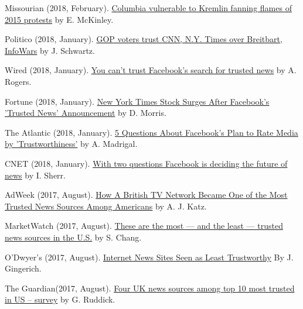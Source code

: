 \begin{bibenum}
    \item[] Missourian (2018, February).
      \href{https://www.columbiamissourian.com/news/higher_education/columbia-vulnerable-to-kremlin-fanning-flames-of-protests/article_929cf366-11ad-11e8-9631-63ac0b4a6fd3.html}{Columbia vulnerable to Kremlin fanning flames of 2015 protests} by E. McKinley.
    \item[] Politico (2018, January).
      \href{https://www.politico.com/amp/story/2018/02/06/gop-republican-voters-media-bias-trusted-sites-393650}{ GOP voters trust CNN, N.Y. Times over Breitbart, InfoWars} by J. Schwartz.
    \item[] Wired (2018, January).
      \href{https://www.wired.com/story/you-cant-trust-facebooks-search-for-trusted-news/}{You can't trust Facebook's search for trusted news} by A. Rogers.
    \item[] Fortune (2018, January).
      \href{http://fortune.com/2018/01/21/new-york-times-stock-facebooks-trusted-news/}{New York Times Stock Surges After Facebook's 'Trusted News' Announcement} by D. Morris.
    \item[] The Atlantic (2018, January).
      \href{https://www.theatlantic.com/technology/archive/2018/01/facebook-media-trustworthiness/551045/}{5 Questions About Facebook's Plan to Rate Media by 'Trustworthiness'} by A. Madrigal.
    \item[] CNET (2018, January).
      \href{https://www.cnet.com/news/with-two-questions-facebook-is-deciding-the-future-of-news-zuckerberg-fake-news/}{With
    two questions Facebook is deciding the future of news} by I. Sherr.
    \item[] AdWeek (2017, August).
      \href{http://www.adweek.com/tvnewser/how-a-british-tv-network-became-one-of-the-most-trusted-news-sources-among-americans/339872}{How A British TV Network Became One of the Most Trusted News Sources Among Americans} by A. J. Katz.
    \item[] MarketWatch (2017, August).
      \href{https://www.marketwatch.com/story/these-are-the-most-and-the-least-trusted-news-sources-in-the-us-2017-08-03}{These are the most — and the least — trusted news sources in the U.S.} by S. Chang.
    \item[] O'Dwyer's (2017, August).
      \href{http://www.odwyerpr.com/story/public/9210/2017-08-08/internet-news-sites-seen-as-least-trustworthy.html}{Internet News Sites Seen as Least Trustworthy} By J. Gingerich.
    \item[] The Guardian(2017, August).
      \href{https://www.theguardian.com/media/2017/aug/09/four-uk-news-sources-among-top-10-most-trusted-in-us-survey}{Four UK news sources among top 10 most trusted in US – survey} by G. Ruddick.

\end{bibenum}
